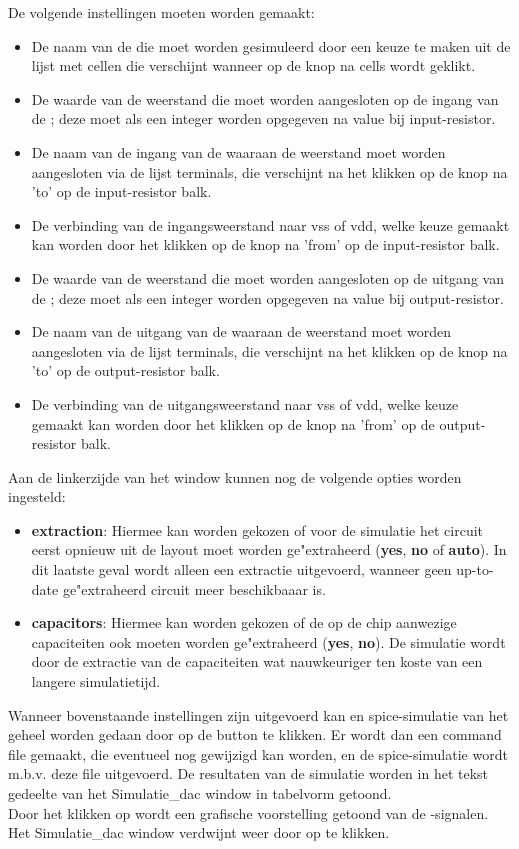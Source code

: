 De volgende instellingen moeten worden gemaakt:
\begin{itemize}
\item De naam van de  die moet worden gesimuleerd door een keuze te maken
     uit de lijst met cellen die verschijnt wanneer op de knop na cells wordt
     geklikt.
\item De waarde van de weerstand die moet worden aangesloten op de ingang van
      de ; deze moet als een integer worden opgegeven na value bij
      input-resistor.
\item De naam van de ingang van de  waaraan de weerstand moet worden
      aangesloten via de lijst terminals, die verschijnt na het klikken op de
      knop na 'to' op de input-resistor balk.
\item De verbinding van de ingangsweerstand naar vss of vdd, welke keuze
      gemaakt kan worden door het klikken op de knop na 'from' op de
      input-resistor balk.
\item De waarde van de weerstand die moet worden aangesloten op de uitgang van
      de ; deze moet als een integer worden opgegeven na value bij
      output-resistor.
\item De naam van de uitgang van de  waaraan de weerstand moet worden
      aangesloten via de lijst terminals, die verschijnt na het klikken op de
      knop na 'to' op de output-resistor balk.
\item De verbinding van de uitgangsweerstand naar vss of vdd, welke keuze
      gemaakt kan worden door het klikken op de knop na 'from' op de
      output-resistor balk.
\end{itemize}
Aan de linkerzijde van het window kunnen nog de volgende opties worden ingesteld:
\begin{itemize}
\item {\bf extraction}: Hiermee kan worden gekozen of voor de simulatie het circuit
      eerst opnieuw uit de layout moet worden ge"extraheerd ({\bf yes}, {\bf no} of {\bf auto}).
      In dit laatste geval wordt alleen een extractie uitgevoerd, wanneer geen
      up-to-date ge"extraheerd circuit meer beschikbaaar is.
\item {\bf capacitors}: Hiermee kan worden gekozen of de op de chip aanwezige
      capaciteiten ook moeten worden ge"extraheerd ({\bf yes}, {\bf no}). De simulatie wordt
      door de extractie van de capaciteiten wat nauwkeuriger ten koste
      van een langere simulatietijd.
\end{itemize}
Wanneer bovenstaande instellingen zijn uitgevoerd kan en spice-simulatie van het geheel
worden gedaan door op de button  te klikken.
Er wordt dan een command file gemaakt, die eventueel nog gewijzigd kan worden,
en de spice-simulatie wordt m.b.v. deze file uitgevoerd.
De resultaten van de simulatie worden in het tekst gedeelte van het
Simulatie\_dac window in tabelvorm getoond.\\
Door het klikken op  wordt een grafische voorstelling getoond van
de -signalen.\\
Het Simulatie\_dac window verdwijnt weer door op  te klikken.

